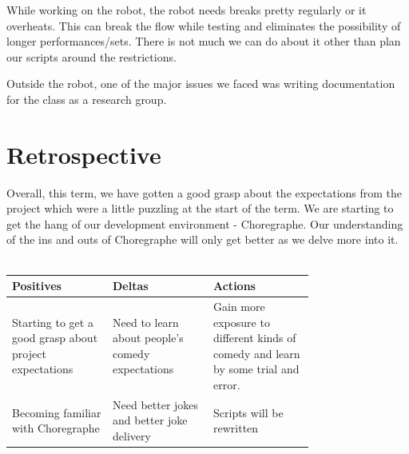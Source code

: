 \documentclass[onecolumn, draftclsnofoot,10pt, compsoc]{IEEEtran}
\begin{document}
While working on the robot, the robot needs breaks pretty regularly or it overheats. This can break the flow while testing and eliminates the possibility of longer performances/sets. There is not much we can do about it other than plan our scripts around the restrictions.

Outside the robot, one of the major issues we faced was writing documentation for the class as a research group.

\section{Retrospective}

Overall, this term, we have gotten a good grasp about the expectations from the project which were a little puzzling at the start of the term. We are starting to get the hang of our development environment - Choregraphe. Our understanding of the ins and outs of Choregraphe will only get better as we delve more into it. \\ \\

\begin{tabular}{|p{0.25\linewidth}|p{0.25\linewidth}|p{0.25\linewidth}|}
\hline
\centering  Positives &
\centering Deltas &
\centering Actions \tabularnewline
\hline

Starting to get a good grasp about project expectations &
Need to learn about people's comedy expectations &
Gain more exposure to different kinds of comedy and learn by some trial and error. \\
\hline
Becoming familiar with Choregraphe &
Need better jokes and better joke delivery &
Scripts will be rewritten \\
\hline



\end{tabular}

\pagebreak


% 
% 
\end{document}

